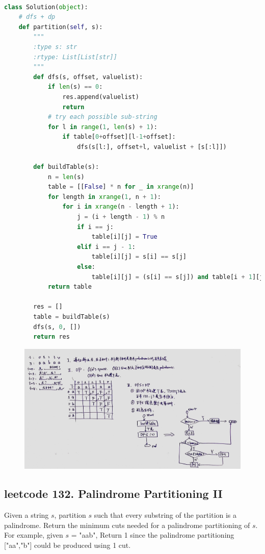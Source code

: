 \documentclass[a4paper,10pt]{article}
\begin{document}
\begin{lstlisting}[language=Python, caption=Problem131. Palindrome Partitioning]

class Solution(object):
    # dfs + dp
    def partition(self, s):
        """
        :type s: str
        :rtype: List[List[str]]
        """
        def dfs(s, offset, valuelist):
            if len(s) == 0:
                res.append(valuelist)
                return
            # try each possible sub-string
            for l in range(1, len(s) + 1):
                if table[0+offset][l-1+offset]:
                    dfs(s[l:], offset+l, valuelist + [s[:l]])

        def buildTable(s):
            n = len(s)
            table = [[False] * n for _ in xrange(n)]
            for length in xrange(1, n + 1):
                for i in xrange(n - length + 1):
                    j = (i + length - 1) % n
                    if i == j:
                        table[i][j] = True
                    elif i == j - 1:
                        table[i][j] = s[i] == s[j]
                    else:
                        table[i][j] = (s[i] == s[j]) and table[i + 1][j - 1]
            return table

        res = []
        table = buildTable(s)
        dfs(s, 0, [])
        return res
\end{lstlisting}

\begin{figure}[h]
    \includegraphics[width=1\textwidth]{leetcode131.jpg}
    \centering\\
\end{figure}



\subsection{leetcode 132. Palindrome Partitioning II}
Given a string $s$, partition $s$ such that every substring of the partition is a palindrome. Return the minimum cuts needed for a palindrome partitioning of $s$. For example, given $s$ = "aab", Return 1 since the palindrome partitioning ["aa","b"] could be produced using 1 cut. \\
\end{document}
